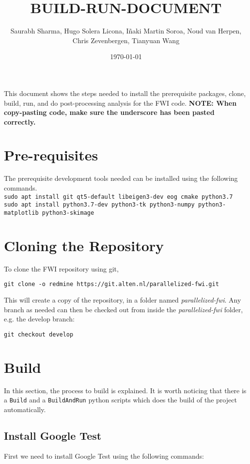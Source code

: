 \documentclass[10pt]{article}
\title{BUILD-RUN-DOCUMENT}
\author{Saurabh Sharma, Hugo Solera Licona, I\~{n}aki Martin Soroa, Noud van Herpen, \\
Chris Zevenbergen, Tianyuan Wang}
\date{\today}
\begin{document}
\maketitle
\noindent This document shows the steps needed to install the prerequisite packages, clone, build, run, and do post-processing analysis for the FWI code. 
\newline
\newline\textbf{NOTE: When copy-pasting code, make sure the underscore has been pasted correctly.}

\section{Pre-requisites}
The prerequisite development tools needed can be installed using the following commands.\\

\noindent \texttt{sudo apt install git qt5-default libeigen3-dev eog cmake python3.7}\\
\texttt{sudo apt install python3.7-dev python3-tk python3-numpy python3-matplotlib python3-skimage}  


\section{Cloning the Repository}
\noindent To clone the FWI repository using git, 
\newline

\texttt{git clone -o redmine https://git.alten.nl/parallelized-fwi.git} 
\newline

This will create a copy of the repository, in a folder named \textit{parallelized-fwi}. Any branch as needed can then be checked out from inside the \textit{parallelized-fwi} folder, e.g. the develop branch: 
\newline

\texttt{git checkout develop}

\section{Build}
In this section, the process to build is explained. It is worth noticing that there is a \texttt{Build} and a \texttt{BuildAndRun} python scripts which does the build of the project automatically. 


\subsection{Install Google Test}
First we need to install Google Test using the following commands:
\newline
\end{document}
